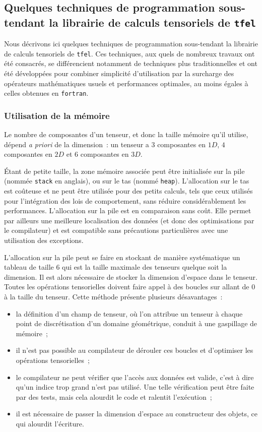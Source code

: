 \documentclass[rectoverso,pleiades,pstricks,leqno,anti]{texmf/note_technique_2010}
\newcommand{\tfel}{\texttt{tfel}}
\newcommand{\fortran}{\texttt{fortran}}
\begin{document}
\subsection{Quelques techniques de programmation sous-tendant la
  librairie de calculs tensoriels de \tfel{}}

Nous décrivons ici quelques techniques de programmation sous-tendant
la librairie de calculs tensoriels de \tfel{}. Ces techniques, aux
quels de nombreux travaux ont été consacrés, se différencient
notamment de techniques plus traditionnelles et ont été développées
pour combiner simplicité d'utilisation par la surcharge des opérateurs
mathématiques usuels et performances optimales, au moins égales à
celles obtenues en \fortran{}.

\subsubsection{Utilisation de la mémoire}

Le nombre de composantes d'un tenseur, et donc la taille mémoire qu'il
utilise, dépend {\em a priori} de la dimension~: un tenseur a \(3\)
composantes en \(1D\), \(4\) composantes en \(2D\) et \(6\)
composantes en \(3D\).

Étant de petite taille, la zone mémoire associée peut être initialisée
sur la pile (nommée \texttt{stack} en anglais), ou sur le tas (nommé
\texttt{heap}). L'allocation sur le tas est coûteuse et ne peut être
utilisée pour des petits calculs, tels que ceux utilisés pour
l'intégration des lois de comportement, sans réduire considérablement
les performances. L'allocation sur la pile est en comparaison sans
coût. Elle permet par ailleurs une meilleure localisation des données
(et donc des optimisations par le compilateur) et est compatible sans
précautions particulières avec une utilisation des exceptions.

L'allocation sur la pile peut se faire en stockant de manière
systématique un tableau de taille \(6\) qui est la taille maximale des
tenseurs quelque soit la dimension. Il est alors nécessaire de stocker
la dimension d'espace dans le tenseur. Toutes les opérations
tensorielles doivent faire appel à des boucles sur allant de \(0\) à la
taille du tenseur. Cette méthode présente plusieurs désavantages~:
\begin{itemize}
  \item la définition d'un champ de tenseur, où l'on attribue un tenseur
  à chaque point de discrétisation d'un domaine géométrique, conduit à
  une gaspillage de mémoire~;
  \item il n'est pas possible au compilateur de dérouler ces boucles et
  d'optimiser les opérations tensorielles~;
  \item le compilateur ne peut vérifier que l'accès aux données est
  valide, c'est à dire qu'un indice trop grand n'est pas utilisé. Une
  telle vérification peut être faite par des tests, mais cela alourdit
  le code et ralentit l'exécution~;
  \item il est nécessaire de passer la dimension d'espace au
  constructeur des objets, ce qui alourdit l'écriture.
\end{itemize}
\end{document}
